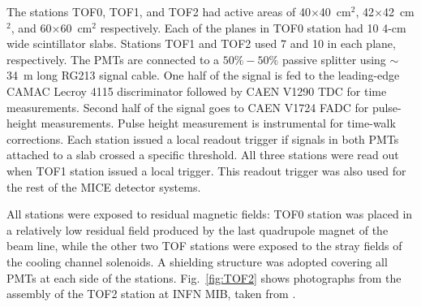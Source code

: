 The stations TOF0, TOF1, and TOF2 had active areas of
40$\times$40~cm$^2$, 42$\times$42~cm$^2$, and 60$\times$60~cm$^2$
respectively.  Each of the planes in TOF0 station had 10 4-cm wide
scintillator slabs. Stations TOF1 and TOF2 used 7 and
10 in each plane, respectively.
The PMTs are connected to a $50\%-50\%$ passive splitter using
$\sim$34~m long RG213 signal cable. One half of the signal is fed to
the leading-edge CAMAC Lecroy 4115 discriminator followed by CAEN
V1290 TDC for time measurements. Second half of the signal goes to
CAEN V1724 FADC for pulse-height measurements. Pulse height
measurement is instrumental for time-walk corrections. Each station
issued a local readout trigger if signals in both PMTs attached to a
slab crossed a specific threshold. All three stations were read out when
TOF1 station issued a local trigger. This readout trigger was also
used for the rest of the MICE detector systems.




All stations were exposed to residual magnetic fields: TOF0 station was placed in a relatively low residual field produced by the last quadrupole magnet of the beam line, while the other two TOF stations were exposed to the stray fields of the cooling channel solenoids. A shielding structure was adopted covering all PMTs at each side of the stations. Fig.~\ref{fig:TOF2} shows photographs from the assembly of the TOF2 station at INFN MIB, taken from \cite{NOTE286}.


